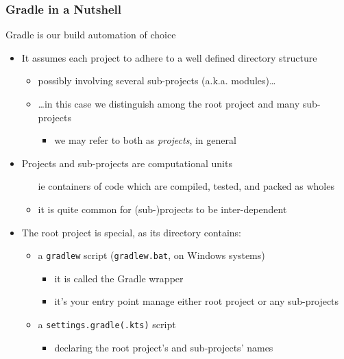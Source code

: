 \documentclass[presentation]{beamer}\mode<presentation>{\usetheme{AMSBolognaFC}}
\begin{document}
\begin{frame}[allowframebreaks]
\frametitle{Gradle in a Nutshell}

    Gradle is our build automation of choice
    \bigskip
    \begin{itemize}
        \item It assumes each project to adhere to a well defined \alert{directory structure}
        \begin{itemize}
            \item possibly involving several \alert{sub-projects} (a.k.a. \alert{modules})\ldots
            \item \ldots in this case we distinguish among the \alert{root} project and many \alert{sub-}projects
            \begin{itemize}
                \item we may refer to both as \emph{projects}, in general
            \end{itemize}
        \end{itemize}

        \bigskip

        \item Projects and sub-projects are \alert{computational units}
        \begin{itemize}
            \item[ie] containers of code which are compiled, tested, and packed \alert{as wholes}
            \item it is quite common for (sub-)projects to be \alert{inter-dependent}
        \end{itemize}

        \framebreak

        \item The \alert{root} project is special, as its directory contains:
        \begin{itemize}
            \item a \alert{\texttt{gradlew}} script (\texttt{gradlew.bat}, on Windows systems)
            \begin{itemize}
                \item it is called the \alert{Gradle wrapper}
                \item it's your entry point manage either root project or any sub-projects
            \end{itemize}

            \item a \alert{\texttt{settings.gradle(.kts)}} script
            \begin{itemize}
                \item declaring the root project's and sub-projects' names
            \end{itemize}
        \end{itemize}


\end{itemize}
\end{frame}
\end{document}
